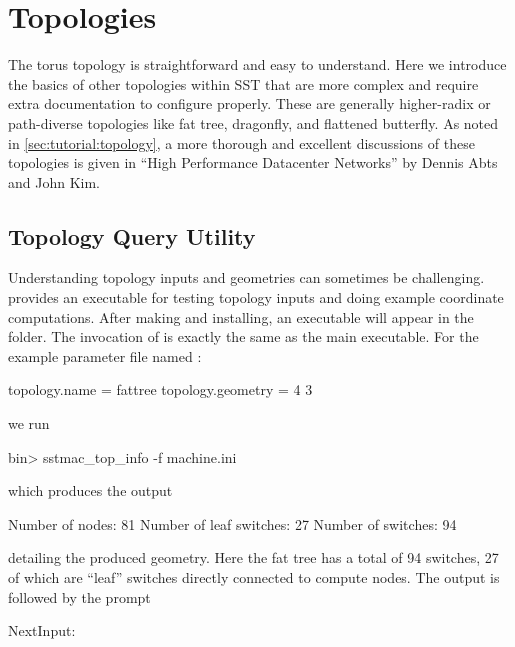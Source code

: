 
\chapter{Topologies}
\label{chapter:topologies}


The torus topology is straightforward and easy to understand.
Here we introduce the basics of other topologies within SST that are more complex and require extra documentation to configure properly.
These are generally higher-radix or path-diverse topologies like fat tree, dragonfly, and flattened butterfly.  
As noted in \ref{sec:tutorial:topology}, a more thorough and excellent discussions of these topologies is given in ``High Performance Datacenter Networks'' by Dennis Abts and John Kim.

\section{Topology Query Utility}
\label{sec:topologyQuery}
Understanding topology inputs and geometries can sometimes be challenging.
\sstmacro provides an executable for testing topology inputs and doing example coordinate computations.
After making and installing, an executable  will appear in the  folder.
The invocation of  is exactly the same as the main  executable.
For the example parameter file named :

\begin{ViFile}
topology.name = fattree
topology.geometry = 4 3
\end{ViFile}

we run

\begin{ShellCmd}
bin> sstmac_top_info -f machine.ini
\end{ShellCmd}
which produces the output

\begin{ViFile}
Number of nodes:         81
Number of leaf switches: 27
Number of switches:      94
\end{ViFile}

detailing the produced geometry.  Here the fat tree has a total of 94 switches, 27 of which are ``leaf'' switches directly connected to compute nodes.
The output is followed by the prompt

\begin{ShellCmd}
NextInput: 
\end{ShellCmd}

